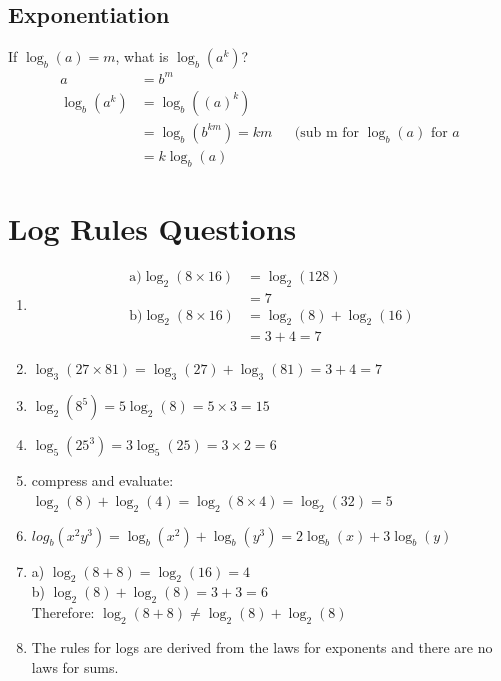 \documentclass{article}
\begin{document}
\subsection{Exponentiation}
If $\log_{b}(a) = m$, what is $\log_{b}(a^k)$?
\begin{align*}
  a &= b^m \\
  \log_{b}(a^k) &= \log_{b}((a)^k) \\ &= \log_{b}(b^{km}) = km && \text{(sub m for $\log_{b}(a)$ for $a$} \\
  &= k\log_{b}(a)
\end{align*}

\section{Log Rules Questions}
\begin{enumerate}[label=\textbf{\arabic*.}, itemsep=1.2em]
  \item 
    \begin{align*}
      \text{a)} \log_{2}(8 \times 16) &= \log_{2}(128) \\
                       &= 7 \\ 
      \text{b)} \log_{2}(8 \times 16) &= \log_{2}(8) + \log_{2}(16) \\ 
                       &= 3 + 4 = 7
    \end{align*}
  \item $\log_{3}(27 \times 81) = \log_{3}(27) + \log_{3}(81) = 3 + 4 = 7$
  \item $\log_{2}(8^5) = 5\log_{2}(8) = 5 \times 3 = 15$
  \item $\log_{5}(25^3) = 3\log_{5}(25) = 3 \times 2 = 6$
  \item compress and evaluate: $\log_{2}(8) + \log_{2}(4) = \log_{2}(8 \times 4) = \log_{2}(32) = 5$
  \item $log_{b}(x^2y^3) = \log_{b}(x^2) + \log_{b}(y^3) = 2\log_{b}(x) + 3\log_{b}(y)$
  \item a) $\log_{2}(8 + 8) = \log_{2}(16) = 4$ \\ b) $\log_{2}(8) + \log_{2}(8) = 3 + 3 = 6$ \\ Therefore: $\log_{2}(8 + 8) \neq \log_{2}(8) + \log_{2}(8)$
  \item The rules for logs are derived from the laws for exponents and there are no laws for sums. 
\end{enumerate}
\end{document}
